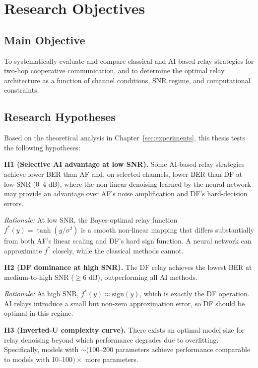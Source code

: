\chapter{Research Objectives}\label{sec:research-objectives}

\section{Main Objective}\label{sec:main-objective}

To systematically evaluate and compare classical and AI-based relay strategies for two-hop cooperative communication, and to determine the optimal relay architecture as a function of channel conditions, SNR regime, and computational constraints.

\section{Research Hypotheses}\label{sec:research-hypotheses}

Based on the theoretical analysis in Chapter~\ref{sec:experiments}, this thesis tests the following hypotheses:

\textbf{H1 (Selective AI advantage at low SNR).} Some AI-based relay strategies achieve lower BER than AF and, on selected channels, lower BER than DF at low SNR (0--4 dB), where the non-linear denoising learned by the neural network may provide an advantage over AF's noise amplification and DF's hard-decision errors.

\emph{Rationale:} At low SNR, the Bayes-optimal relay function \(f^*(y) = \tanh(y/\sigma^2)\) is a smooth non-linear mapping that differs substantially from both AF's linear scaling and DF's hard sign function. A neural network can approximate \(f^*\) closely, while the classical methods cannot.

\textbf{H2 (DF dominance at high SNR).} The DF relay achieves the lowest BER at medium-to-high SNR (\(\geq 6\) dB), outperforming all AI methods.

\emph{Rationale:} At high SNR, \(f^*(y) \approx \text{sign}(y)\), which is exactly the DF operation. AI relays introduce a small but non-zero approximation error, so DF should be optimal in this regime.

\textbf{H3 (Inverted-U complexity curve).} There exists an optimal model size for relay denoising beyond which performance degrades due to overfitting. Specifically, models with $\sim$(100–200 parameters achieve performance comparable to models with 10–100$)\times$ more parameters.

